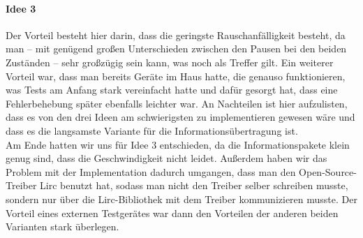 \paragraph{Idee 3}
Der Vorteil besteht hier darin, dass die geringste Rauschanfälligkeit besteht, da man – mit genügend
großen Unterschieden zwischen den Pausen bei den beiden Zuständen – sehr großzügig sein kann, was
noch als Treffer gilt.
Ein weiterer Vorteil war, dass man bereits Geräte im Haus hatte, die genauso funktionieren, was
Tests am Anfang stark vereinfacht hatte und dafür gesorgt hat, dass eine Fehlerbehebung später
ebenfalls leichter war.
An Nachteilen ist hier aufzulisten, dass es von den drei Ideen am schwierigsten zu implementieren
gewesen wäre und dass es die langsamste Variante für die Informationsübertragung ist. \\

Am Ende hatten wir uns für Idee 3 entschieden, da die Informationspakete klein genug sind, dass
die Geschwindigkeit nicht leidet.
Außerdem haben wir das Problem mit der Implementation dadurch umgangen, dass man den
Open-Source-Treiber Lirc benutzt hat, sodass man nicht den Treiber selber schreiben musste, sondern
nur über die Lirc-Bibliothek mit dem Treiber kommunizieren musste.
Der Vorteil eines externen Testgerätes war dann den Vorteilen der anderen beiden Varianten stark
überlegen.
